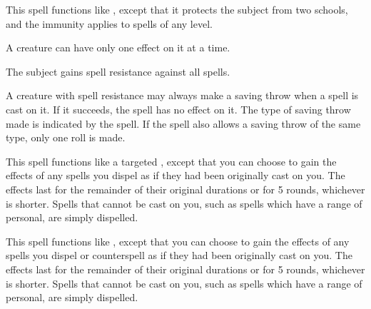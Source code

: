 \begin{spelleffect}
  This spell functions like , except that it protects the subject from two schools, and the immunity applies to spells of any level.
\end{spelleffect}
\begin{spellnotes}
  A creature can have only one  effect on it at a time.
\end{spellnotes}

\spellrng{\rngclose}
\spelldur{\durshort}
\begin{spelleffect}
  The subject gains spell resistance against all spells.
\end{spelleffect}
\begin{spellnotes}
  A creature with spell resistance may always make a saving throw when a spell is cast on it. If it succeeds, the spell has no effect on it. The type of saving throw made is indicated by the spell. If the spell also allows a saving throw of the same type, only one roll is made.
\end{spellnotes}

\begin{spelleffect}
  This spell functions like a targeted , except that you can choose to gain the effects of any spells you dispel as if they had been originally cast on you. The effects last for the remainder of their original durations or for 5 rounds, whichever is shorter. Spells that cannot be cast on you, such as spells which have a range of personal, are simply dispelled.
\end{spelleffect}

\begin{spelleffect}
  This spell functions like , except that you can choose to gain the effects of any spells you dispel or counterspell as if they had been originally cast on you. The effects last for the remainder of their original durations or for 5 rounds, whichever is shorter. Spells that cannot be cast on you, such as spells which have a range of personal, are simply dispelled.
\end{spelleffect}

